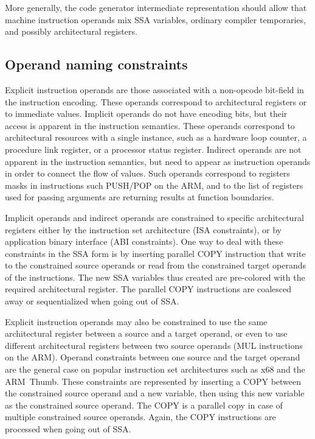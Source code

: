 More generally, the code generator intermediate representation should allow
that machine instruction operands mix SSA variables, ordinary compiler
temporaries, and possibly architectural registers.

\subsection{Operand naming constraints}

Explicit instruction operands are those associated with a non-opcode bit-field
in the instruction encoding. These operands correspond to architectural
registers or to immediate values. Implicit operands do not have encoding bits,
but their access is apparent in the instruction semantics. These operands
correspond to architectural resources with a single instance, such as a
hardware loop counter, a procedure link register, or a processor status
register. Indirect operands are not apparent in the instruction semantics, but
need to appear as instruction operands in order to connect the flow of values.
Such operands correspond to registers masks in instructions such PUSH/POP on
the ARM, and to the list of registers used for passing arguments are returning
results at function boundaries.

Implicit operands and indirect operands are constrained to specific
architectural registers either by the instruction set architecture (ISA
constraints), or by application binary interface (ABI constraints). One way to
deal with these constraints in the SSA form is by inserting parallel COPY
instruction that write to the constrained source operands or read from the
constrained target operands of the instructions. The new SSA variables thus
created are pre-colored with the required architectural register. The parallel
COPY instructions are coalesced away or sequentialized when going out of SSA.

Explicit instruction operands may also be constrained to use the same
architectural register between a source and a target operand, or even to use
different architectural registers between two source operands (MUL instructions
on the ARM). Operand constraints between one source and the target operand are
the general case on popular instruction set architectures such as x68 and the
ARM~Thumb. These constraints are represented by inserting a COPY between the
constrained source operand and a new variable, then using this new variable as
the constrained source operand. The COPY is a parallel copy in case of multiple
constrained source operands. Again, the COPY instructions are processed when
going out of SSA.

